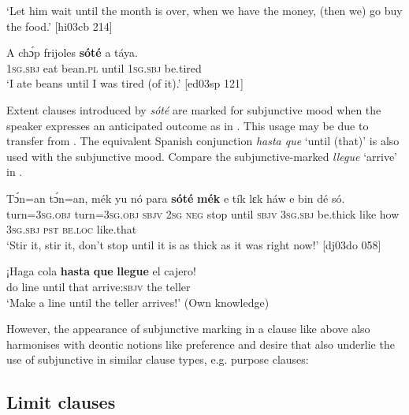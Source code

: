 \glt ‘Let him wait until the month is over, when we have the money, (then we) 
go buy the food.’ [hi03cb 214]
\z


\ea%
    \label{ex:key:1511}
    \gll A    chɔ́p  frijoles  \textbf{sóté}    a    táya.\\
\textsc{1sg.sbj}  eat    bean.\textsc{pl}  until  \textsc{1sg.sbj}  be.tired\\

\glt ‘I ate beans until I was tired (of it).’ [ed03sp 121]
\z

Extent clauses introduced by \textit{sóté} are marked for subjunctive mood when the speaker expresses an anticipated outcome as in . This usage may be due to transfer from . The equivalent Spanish conjunction \textit{hasta que} ‘until (that)’ is also used with the subjunctive mood. Compare the subjunctive-marked \textit{llegue} ‘arrive’ in .


\ea%
    \label{ex:key:1512}
    \gll Tɔ́n=an    tɔ́n=an,    mék  yu  nó  para    \textbf{sóté}    \textbf{mék}   e    tík
lɛk  háw    e    bin  dé    só.\\
turn=\textsc{3sg.obj}  turn=\textsc{3sg.obj}  \textsc{sbjv}  \textsc{2sg}  \textsc{neg}  stop    until  \textsc{sbjv}    \textsc{3sg.sbj}  be.thick
like  how    \textsc{3sg.sbj}  \textsc{pst}  \textsc{be.loc}  like.that\\

\glt ‘Stir it, stir it, don’t stop until it is as thick as it was right now!’ [dj03do 058]
\z


\ea%
    \label{ex:key:1513}
    \gll ¡Haga  cola    \textbf{hasta} \textbf{que}  \textbf{llegue}    el  cajero!\\
do    line    until that  arrive:\textsc{sbjv}  the  teller\\

\glt ‘Make a line until the teller arrives!’ (Own knowledge)
\z

However, the appearance of subjunctive marking in a clause like  above also harmonises with deontic notions like preference and desire that also underlie the use of subjunctive in similar clause types, e.g. purpose clauses:

\subsection{Limit clauses}\label{sec:10.7.9}

